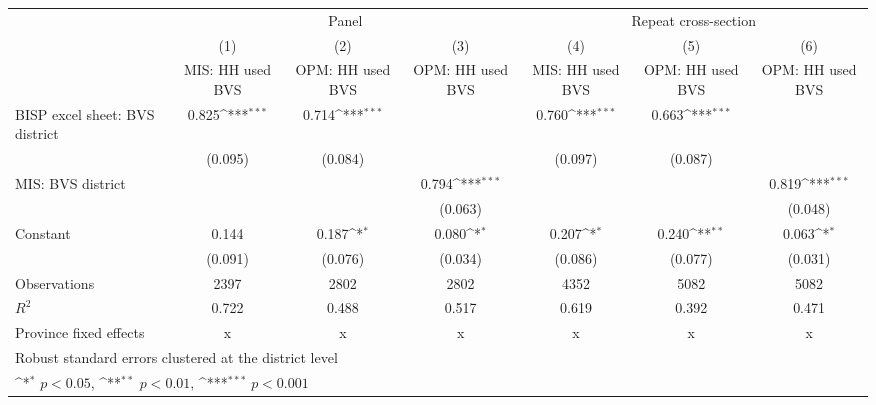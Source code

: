 {
\def\sym#1{\ifmmode^{#1}\else\(^{#1}\)\fi}
\begin{tabular}{l*{6}{c}}
\hline\hline
                    &\multicolumn{3}{c}{Panel}                                        &\multicolumn{3}{c}{Repeat cross-section}                         \\\cmidrule(lr){2-4}\cmidrule(lr){5-7}
                    &\multicolumn{1}{c}{(1)}&\multicolumn{1}{c}{(2)}&\multicolumn{1}{c}{(3)}&\multicolumn{1}{c}{(4)}&\multicolumn{1}{c}{(5)}&\multicolumn{1}{c}{(6)}\\
                    &\multicolumn{1}{c}{MIS: HH used BVS}&\multicolumn{1}{c}{OPM: HH used BVS}&\multicolumn{1}{c}{OPM: HH used BVS}&\multicolumn{1}{c}{MIS: HH used BVS}&\multicolumn{1}{c}{OPM: HH used BVS}&\multicolumn{1}{c}{OPM: HH used BVS}\\
\hline
BISP excel sheet: BVS district&       0.825\sym{***}&       0.714\sym{***}&                     &       0.760\sym{***}&       0.663\sym{***}&                     \\
                    &     (0.095)         &     (0.084)         &                     &     (0.097)         &     (0.087)         &                     \\
[1em]
MIS: BVS district   &                     &                     &       0.794\sym{***}&                     &                     &       0.819\sym{***}\\
                    &                     &                     &     (0.063)         &                     &                     &     (0.048)         \\
[1em]
Constant            &       0.144         &       0.187\sym{*}  &       0.080\sym{*}  &       0.207\sym{*}  &       0.240\sym{**} &       0.063\sym{*}  \\
                    &     (0.091)         &     (0.076)         &     (0.034)         &     (0.086)         &     (0.077)         &     (0.031)         \\
\hline
Observations        &        2397         &        2802         &        2802         &        4352         &        5082         &        5082         \\
\(R^{2}\)           &       0.722         &       0.488         &       0.517         &       0.619         &       0.392         &       0.471         \\
Province fixed effects&           x         &           x         &           x         &           x         &           x         &           x         \\
\hline\hline
\multicolumn{7}{l}{\footnotesize Robust standard errors clustered at the district level}\\
\multicolumn{7}{l}{\footnotesize \sym{*} \(p<0.05\), \sym{**} \(p<0.01\), \sym{***} \(p<0.001\)}\\
\end{tabular}
}
